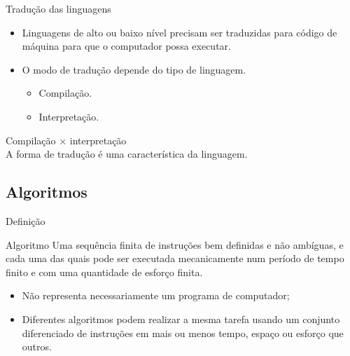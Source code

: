 \documentclass[handout]{beamer}
\begin{document}
  \begin{frame}{Tradução das linguagens}
    \begin{itemize}
    \item  Linguagens de alto ou baixo nível precisam ser
      traduzidas para código de máquina para que o computador possa
      executar. \pause
    \item O modo de tradução depende do tipo de linguagem.
      \begin{itemize}
      \item Compilação.
      \item Interpretação.
      \end{itemize}
    \end{itemize}
\pause
    \begin{center}
    \end{center}
  \end{frame}

  \begin{frame}{Compilação $\times$ interpretação}
\centering
      \\ \pause
  A forma de tradução é uma característica da linguagem.
  \end{frame}


\subsection{Algoritmos}
\begin{frame}{Definição}

  \begin{block}{Algoritmo}
    Uma sequência finita de instruções  bem definidas e não ambíguas, e cada uma das quais pode ser executada mecanicamente num período de tempo finito e com uma quantidade de esforço finita.
  \end{block} 
  \begin{itemize}[<+->]
  \item Não representa necessariamente um programa de computador;

  \item Diferentes algoritmos podem realizar a mesma tarefa usando um
    conjunto diferenciado de instruções em mais ou menos tempo, espaço
    ou esforço que outros.
  \end{itemize}
\end{frame}
\end{document}
